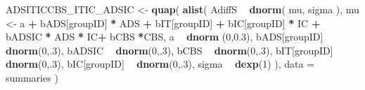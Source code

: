 \documentclass[10pt,dvipsnames,enabledeprecatedfontcommands]{scrartcl}
\newenvironment{Shaded}{\begin{snugshade}}{\end{snugshade}}
\newcommand{\DataTypeTok}[1]{\textcolor[rgb]{0.13,0.29,0.53}{#1}}
\newcommand{\DecValTok}[1]{\textcolor[rgb]{0.00,0.00,0.81}{#1}}
\newcommand{\FloatTok}[1]{\textcolor[rgb]{0.00,0.00,0.81}{#1}}
\newcommand{\KeywordTok}[1]{\textcolor[rgb]{0.13,0.29,0.53}{\textbf{#1}}}
\newcommand{\NormalTok}[1]{#1}
\newcommand{\OperatorTok}[1]{\textcolor[rgb]{0.81,0.36,0.00}{\textbf{#1}}}
\newcommand{\StringTok}[1]{\textcolor[rgb]{0.31,0.60,0.02}{#1}}
\begin{document}
\begin{Shaded}
\begin{Highlighting}[]
\NormalTok{ADSITICCBS_ITIC_ADSIC <-}\StringTok{ }\KeywordTok{quap}\NormalTok{(}
  \KeywordTok{alist}\NormalTok{(}
\NormalTok{    AdiffS }\OperatorTok{~}\StringTok{ }\KeywordTok{dnorm}\NormalTok{( mu, sigma ),}
\NormalTok{    mu <-}\StringTok{ }\NormalTok{a }\OperatorTok{+}\StringTok{ }\NormalTok{bADS[groupID] }\OperatorTok{*}\StringTok{ }\NormalTok{ADS }\OperatorTok{+}\StringTok{  }\NormalTok{bIT[groupID] }\OperatorTok{+}\StringTok{ }\NormalTok{bIC[groupID] }\OperatorTok{*}\StringTok{ }\NormalTok{IC }\OperatorTok{+}\StringTok{ }
\StringTok{      }\NormalTok{bADSIC }\OperatorTok{*}\StringTok{ }\NormalTok{ADS }\OperatorTok{*}\StringTok{ }\NormalTok{IC}\OperatorTok{+}\StringTok{ }\NormalTok{bCBS }\OperatorTok{*}\NormalTok{CBS,}
\NormalTok{    a }\OperatorTok{~}\StringTok{ }\KeywordTok{dnorm}\NormalTok{ (}\DecValTok{0}\NormalTok{,}\FloatTok{0.3}\NormalTok{),}
\NormalTok{    bADS[groupID] }\OperatorTok{~}\StringTok{ }\KeywordTok{dnorm}\NormalTok{(}\DecValTok{0}\NormalTok{,.}\DecValTok{3}\NormalTok{),}
\NormalTok{    bADSIC }\OperatorTok{~}\StringTok{ }\KeywordTok{dnorm}\NormalTok{(}\DecValTok{0}\NormalTok{,.}\DecValTok{3}\NormalTok{),}
\NormalTok{    bCBS }\OperatorTok{~}\StringTok{ }\KeywordTok{dnorm}\NormalTok{(}\DecValTok{0}\NormalTok{,.}\DecValTok{3}\NormalTok{),}
\NormalTok{    bIT[groupID] }\OperatorTok{~}\StringTok{ }\KeywordTok{dnorm}\NormalTok{(}\DecValTok{0}\NormalTok{,.}\DecValTok{3}\NormalTok{),}
\NormalTok{    bIC[groupID] }\OperatorTok{~}\StringTok{ }\KeywordTok{dnorm}\NormalTok{(}\DecValTok{0}\NormalTok{,.}\DecValTok{3}\NormalTok{),}
\NormalTok{    sigma  }\OperatorTok{~}\StringTok{ }\KeywordTok{dexp}\NormalTok{(}\DecValTok{1}\NormalTok{)}
\NormalTok{  ), }
  \DataTypeTok{data =}\NormalTok{ summaries}
\NormalTok{)}



\end{Highlighting}
\end{Shaded}
\end{document}
